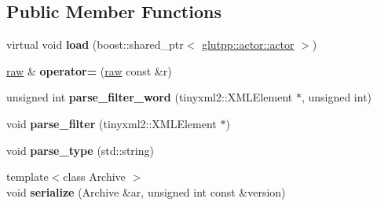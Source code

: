 \subsection*{\-Public \-Member \-Functions}
\begin{DoxyCompactItemize}
\item 
\hypertarget{classglutpp_1_1actor_1_1raw_a63ee70e32b19db80cccea5f4a603e6b4}{virtual void {\bfseries load} (boost\-::shared\-\_\-ptr$<$ \hyperlink{classglutpp_1_1actor_1_1actor}{glutpp\-::actor\-::actor} $>$)}\label{classglutpp_1_1actor_1_1raw_a63ee70e32b19db80cccea5f4a603e6b4}

\item 
\hypertarget{classglutpp_1_1actor_1_1raw_a5408c7419273e49a5c9f4732b362a661}{\hyperlink{classglutpp_1_1actor_1_1raw}{raw} \& {\bfseries operator=} (\hyperlink{classglutpp_1_1actor_1_1raw}{raw} const \&r)}\label{classglutpp_1_1actor_1_1raw_a5408c7419273e49a5c9f4732b362a661}

\item 
\hypertarget{classglutpp_1_1actor_1_1raw_a8436f59f2473f956e735830e3f7b867c}{unsigned int {\bfseries parse\-\_\-filter\-\_\-word} (tinyxml2\-::\-X\-M\-L\-Element $\ast$, unsigned int)}\label{classglutpp_1_1actor_1_1raw_a8436f59f2473f956e735830e3f7b867c}

\item 
\hypertarget{classglutpp_1_1actor_1_1raw_ac60d79aa29a77f54010aed9ef57511f0}{void {\bfseries parse\-\_\-filter} (tinyxml2\-::\-X\-M\-L\-Element $\ast$)}\label{classglutpp_1_1actor_1_1raw_ac60d79aa29a77f54010aed9ef57511f0}

\item 
\hypertarget{classglutpp_1_1actor_1_1raw_af847865b7f9e9ecbbcd4d3609ac677b3}{void {\bfseries parse\-\_\-type} (std\-::string)}\label{classglutpp_1_1actor_1_1raw_af847865b7f9e9ecbbcd4d3609ac677b3}

\item 
\hypertarget{classglutpp_1_1actor_1_1raw_a648c59279ff8756bb822489cfc9caf62}{{\footnotesize template$<$class Archive $>$ }\\void {\bfseries serialize} (\-Archive \&ar, unsigned int const \&version)}\label{classglutpp_1_1actor_1_1raw_a648c59279ff8756bb822489cfc9caf62}

\end{DoxyCompactItemize}
